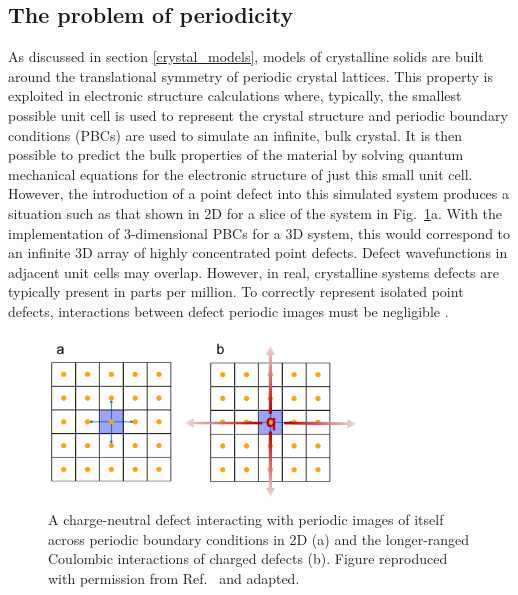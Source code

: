 \documentclass[11pt, twoside]{report}
\begin{document}
\subsection{The problem of periodicity}
As discussed in section \ref{crystal_models}, models of crystalline solids are built around the translational symmetry of periodic crystal lattices. This property is exploited in electronic structure calculations where, typically, the smallest possible unit cell is used to represent the crystal structure and periodic boundary conditions (PBCs) are used to simulate an infinite, bulk crystal. It is then possible to predict the bulk properties of the material by solving quantum mechanical equations for the electronic structure of just this small unit cell. However, the introduction of a point defect into this simulated system produces a situation such as that shown in 2D for a slice of the system in Fig.~\ref{defect_PBCs}a. With the implementation of 3-dimensional PBCs for a 3D system, this would correspond to an infinite 3D array of highly concentrated point defects. Defect wavefunctions in adjacent unit cells may overlap. However, in real, crystalline systems defects are typically present in parts per million.  To correctly represent isolated point defects, interactions between defect periodic images must be negligible \cite{freysoldt_rev}.

\begin{figure}[h!]
  \centering
    \includegraphics[width=0.75\textwidth]{figures/ase_defects.png}
    \caption[A charge-neutral defect interacting with periodic images of itself across periodic boundary conditions in 2D (a) and the longer-ranged Coulombic interactions of charged defects (b).]{A charge-neutral defect interacting with periodic images of itself across periodic boundary conditions in 2D (a) and the longer-ranged Coulombic interactions of charged defects (b). Figure reproduced with permission from Ref.~ and adapted.}
  \label{defect_PBCs}
\end{figure}
\end{document}
